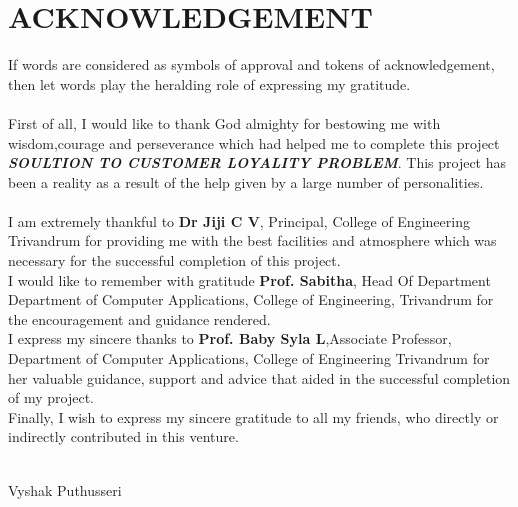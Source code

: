 \chapter*{\rm \large \bf ACKNOWLEDGEMENT}
\vspace{4.0mm}
\setlength{\parindent}{1cm} 


\indent If words are considered as symbols of approval and tokens of
acknowledgement, then let words play the heralding role of expressing my
gratitude.\\ \\
\indent First of all, I would like to thank God almighty for bestowing me with
wisdom,courage and perseverance which had helped me to complete this
project \textbf{\textit{SOULTION TO CUSTOMER LOYALITY PROBLEM}}.
This project has been a reality as a result of the help given by a large
number of personalities.\\ \\
\indent I am extremely thankful to \textbf{Dr Jiji C V}, Principal, College of Engineering Trivandrum for providing me with the best facilities and atmosphere which was necessary for the successful completion of this project.\\ 

\indent I would like to remember with gratitude \textbf{Prof. Sabitha},
Head Of Department Department of Computer Applications, College of Engineering,
Trivandrum for the encouragement and guidance rendered.\\ 

\indent I express my sincere thanks to \textbf{Prof. Baby Syla L},Associate
Professor, Department of Computer Applications, College of Engineering
Trivandrum for her valuable guidance, support and advice that aided in the
successful completion of my project.\\ 

\indent Finally, I wish to express my sincere gratitude to all my friends,
who directly or indirectly contributed in this venture. \\ \\




\begin{flushright}
Vyshak Puthusseri\\
\end{flushright}
\newpage

